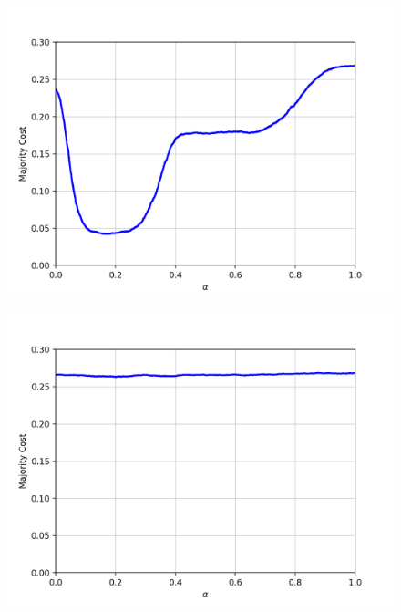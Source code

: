 \begin{figure}[H]
\centering
\begin{minipage}{.45\textwidth}
  \centering
  {\includegraphics[width=\linewidth]{plots/ringsanddiskssc}}
\end{minipage}\quad
\begin{minipage}{.45\textwidth}
  \centering
  {\includegraphics[width=\linewidth]{plots/ringsanddisksac}}
\end{minipage}
\caption{%
  }
\label{fig:syntheticexperiments}
\end{figure}

